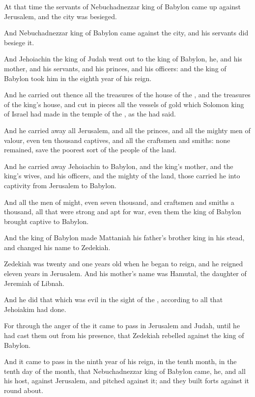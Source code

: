 \Verse At that time the servants of Nebuchadnezzar king of Babylon came up against Jerusalem, and the city was besieged.

\Verse And Nebuchadnezzar king of Babylon came against the city, and his servants did besiege it.

\Verse And Jehoiachin the king of Judah went out to the king of Babylon, he, and his mother, and his servants, and his princes, and his officers: and the king of Babylon took him in the eighth year of his reign.

\Verse And he carried out thence all the treasures of the house of the \LORD, and the treasures of the king's house, and cut in pieces all the vessels of gold which Solomon king of Israel had made in the temple of the \LORD, as the \LORD had said.

\Verse And he carried away all Jerusalem, and all the princes, and all the mighty men of valour, even ten thousand captives, and all the craftsmen and smiths: none remained, save the poorest sort of the people of the land.

\Verse And he carried away Jehoiachin to Babylon, and the king's mother, and the king's wives, and his officers, and the mighty of the land, those carried he into captivity from Jerusalem to Babylon.

\Verse And all the men of might, even seven thousand, and craftsmen and smiths a thousand, all that were strong and apt for war, even them the king of Babylon brought captive to Babylon.

\Verse And the king of Babylon made Mattaniah his father's brother king in his stead, and changed his name to Zedekiah.

\Verse Zedekiah was twenty and one years old when he began to reign, and he reigned eleven years in Jerusalem. And his mother's name was Hamutal, the daughter of Jeremiah of Libnah.

\Verse And he did that which was evil in the sight of the \LORD, according to all that Jehoiakim had done.

\Verse For through the anger of the \LORD it came to pass in Jerusalem and Judah, until he had cast them out from his presence, that Zedekiah rebelled against the king of Babylon.


\Chapter
\Verse And it came to pass in the ninth year of his reign, in the tenth month, in the tenth day of the month, that Nebuchadnezzar king of Babylon came, he, and all his host, against Jerusalem, and pitched against it; and they built forts against it round about.

